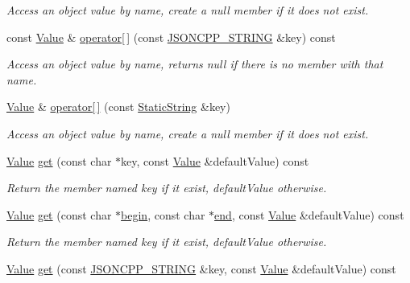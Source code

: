 \begin{DoxyCompactItemize}
\begin{DoxyCompactList}\small\item\em Access an object value by name, create a null member if it does not exist. \end{DoxyCompactList}\item 
const \hyperlink{classJson_1_1Value}{Value} \& \hyperlink{classJson_1_1Value_a4b4d53dead79ee347514170bd21590b8}{operator\mbox{[}$\,$\mbox{]}} (const \hyperlink{json_8hpp_a1e723f95759de062585bc4a8fd3fa4be}{J\+S\+O\+N\+C\+P\+P\+\_\+\+S\+T\+R\+I\+NG} \&key) const 
\begin{DoxyCompactList}\small\item\em Access an object value by name, returns null if there is no member with that name. \end{DoxyCompactList}\item 
\hyperlink{classJson_1_1Value}{Value} \& \hyperlink{classJson_1_1Value_ac3763d7d315ca65dc188e273722f7955}{operator\mbox{[}$\,$\mbox{]}} (const \hyperlink{classJson_1_1StaticString}{Static\+String} \&key)
\begin{DoxyCompactList}\small\item\em Access an object value by name, create a null member if it does not exist. \end{DoxyCompactList}\item 
\hyperlink{classJson_1_1Value}{Value} \hyperlink{classJson_1_1Value_ab76b3323cde14c7db20676d07b260ce7}{get} (const char $\ast$key, const \hyperlink{classJson_1_1Value}{Value} \&default\+Value) const 
\begin{DoxyCompactList}\small\item\em Return the member named key if it exist, default\+Value otherwise. \end{DoxyCompactList}\item 
\hyperlink{classJson_1_1Value}{Value} \hyperlink{classJson_1_1Value_abcb2289c005bc0befdedaa94f662f63f}{get} (const char $\ast$\hyperlink{classJson_1_1Value_ac12df0d6980600c5bac908ed0f64856e}{begin}, const char $\ast$\hyperlink{classJson_1_1Value_a596da1926b2f2a4056bff2edb713eb0b}{end}, const \hyperlink{classJson_1_1Value}{Value} \&default\+Value) const 
\begin{DoxyCompactList}\small\item\em Return the member named key if it exist, default\+Value otherwise. \end{DoxyCompactList}\item 
\hyperlink{classJson_1_1Value}{Value} \hyperlink{classJson_1_1Value_a0d143ddad13c005d123ab30a22dbd521}{get} (const \hyperlink{json_8hpp_a1e723f95759de062585bc4a8fd3fa4be}{J\+S\+O\+N\+C\+P\+P\+\_\+\+S\+T\+R\+I\+NG} \&key, const \hyperlink{classJson_1_1Value}{Value} \&default\+Value) const 

\end{DoxyCompactItemize}
